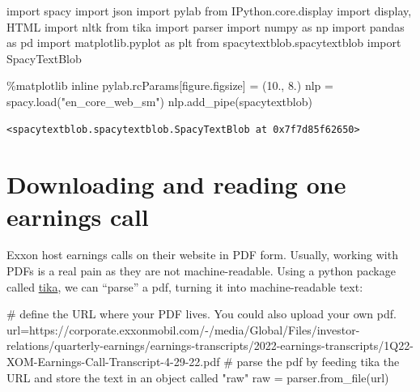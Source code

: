 \documentclass[
  letterpaper,
  DIV=11,
  numbers=noendperiod]{scrreprt}
\newenvironment{Shaded}{\begin{snugshade}}{\end{snugshade}}
\newcommand{\CommentTok}[1]{\textcolor[rgb]{0.37,0.37,0.37}{#1}}
\newcommand{\FloatTok}[1]{\textcolor[rgb]{0.68,0.00,0.00}{#1}}
\newcommand{\ImportTok}[1]{\textcolor[rgb]{0.00,0.46,0.62}{#1}}
\newcommand{\NormalTok}[1]{\textcolor[rgb]{0.00,0.23,0.31}{#1}}
\newcommand{\OperatorTok}[1]{\textcolor[rgb]{0.37,0.37,0.37}{#1}}
\newcommand{\StringTok}[1]{\textcolor[rgb]{0.13,0.47,0.30}{#1}}
\begin{document}
\begin{Shaded}
\begin{Highlighting}[]
\ImportTok{import}\NormalTok{ spacy}
\ImportTok{import}\NormalTok{ json}
\ImportTok{import}\NormalTok{ pylab}
\ImportTok{from}\NormalTok{ IPython.core.display }\ImportTok{import}\NormalTok{ display, HTML}
\ImportTok{import}\NormalTok{ nltk}
\ImportTok{from}\NormalTok{ tika }\ImportTok{import}\NormalTok{ parser}
\ImportTok{import}\NormalTok{ numpy }\ImportTok{as}\NormalTok{ np}
\ImportTok{import}\NormalTok{ pandas }\ImportTok{as}\NormalTok{ pd}
\ImportTok{import}\NormalTok{ matplotlib.pyplot }\ImportTok{as}\NormalTok{ plt}
\ImportTok{from}\NormalTok{ spacytextblob.spacytextblob }\ImportTok{import}\NormalTok{ SpacyTextBlob}

\OperatorTok{\%}\NormalTok{matplotlib inline}
\NormalTok{pylab.rcParams[}\StringTok{\textquotesingle{}figure.figsize\textquotesingle{}}\NormalTok{] }\OperatorTok{=}\NormalTok{ (}\FloatTok{10.}\NormalTok{, }\FloatTok{8.}\NormalTok{)}
\NormalTok{nlp }\OperatorTok{=}\NormalTok{ spacy.load(}\StringTok{"en\_core\_web\_sm"}\NormalTok{)}
\NormalTok{nlp.add\_pipe(}\StringTok{\textquotesingle{}spacytextblob\textquotesingle{}}\NormalTok{)}
\end{Highlighting}
\end{Shaded}

\begin{verbatim}
<spacytextblob.spacytextblob.SpacyTextBlob at 0x7f7d85f62650>
\end{verbatim}

\hypertarget{downloading-and-reading-one-earnings-call}{%
\section{Downloading and reading one earnings
call}\label{downloading-and-reading-one-earnings-call}}

Exxon host earnings calls on their website in PDF form. Usually, working
with PDFs is a real pain as they are not machine-readable. Using a
python package called
\href{https://www.geeksforgeeks.org/parsing-pdfs-in-python-with-tika/}{tika},
we can ``parse'' a pdf, turning it into machine-readable text:

\begin{Shaded}
\begin{Highlighting}[]
\CommentTok{\# define the URL where your PDF lives. You could also upload your own pdf.}
\NormalTok{url}\OperatorTok{=}\StringTok{\textquotesingle{}https://corporate.exxonmobil.com/{-}/media/Global/Files/investor{-}relations/quarterly{-}earnings/earnings{-}transcripts/2022{-}earnings{-}transcripts/1Q22{-}XOM{-}Earnings{-}Call{-}Transcript{-}4{-}29{-}22.pdf\textquotesingle{}}
\CommentTok{\# parse the pdf by feeding tika the URL and store the text in an object called "raw" }
\NormalTok{raw }\OperatorTok{=}\NormalTok{ parser.from\_file(url)}
\end{Highlighting}
\end{Shaded}
\end{document}
